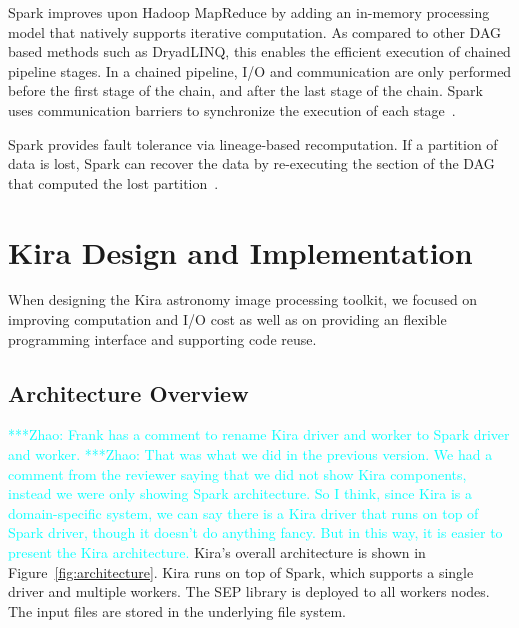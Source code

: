 \documentclass[conference]{IEEEtran}
\newcommand{\zhaonote}[1]{{\textcolor{cyan}    { ***Zhao:      #1 }}}
\newcommand{\zhaonote}[1]{}
\newcommand{\up}{\vspace*{-1em}}
\begin{document}
\up
Spark improves upon
Hadoop MapReduce by adding an in-memory processing model that natively supports iterative computation. 
As compared to other DAG based methods such as DryadLINQ, this enables
the efficient execution of chained pipeline stages. In a chained pipeline,
I/O and communication are only performed before the first stage of the chain, and after the
last stage of the chain. Spark uses communication barriers to synchronize the execution of each stage~\cite{zaharia12}.

Spark provides fault tolerance via
lineage-based recomputation. If a partition of data is lost, Spark can recover the data
by re-executing the section of the DAG that computed the lost partition~\cite{zaharia12}. 

\section{Kira Design and Implementation}
\label{sec:Design}

When designing the Kira astronomy image processing toolkit, 
we focused on improving computation and  I/O cost as well as on providing an flexible programming interface and supporting code reuse.

\subsection{Architecture Overview}
\label{sec:Design-Overview}
\zhaonote{Frank has a comment to rename Kira driver and worker to Spark driver and worker.}
\zhaonote{That was what we did in the previous version. We had a comment from the reviewer 
saying that we did not show Kira components, instead we were only showing Spark architecture.
So I think, since Kira is a domain-specific system, we can say there is a Kira driver that runs
on top of Spark driver, though it doesn't do anything fancy. But in this way, it is easier to present
the Kira architecture.}
Kira's overall architecture is shown in Figure~\ref{fig:architecture}.
Kira runs on top of Spark, which supports a single driver and multiple workers.
The SEP library is deployed to all workers nodes. The input files are
stored in the underlying file system.
\end{document}
